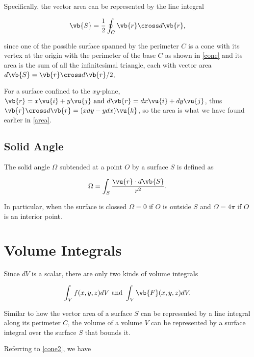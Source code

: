 \documentclass[english,a4paper,12pt]{report}
\begin{document}
Specifically, the vector area can be represented by the line integral 

\begin{equation}
	\vb{S} = \frac{1}{2} \oint_{C} \vb{r} \cross d\vb{r}, 
\end{equation}

since one of the possible surface spanned by the perimeter \(C\) is a cone with its vertex at the origin with the perimeter of the base \(C\) as shown in \cref{cone} and its area is the sum of all the infinitesimal triangle, each with vector area \( d\vb{S} =  \vb{r} \cross d\vb{r} /2  \).  


For a surface confined to the \(xy\)-plane, \(\vb{r} = x \vu{i} + y \vu{j} \text { and } d\vb{r} = dx \vu{i} + dy \vu{j}\), thus \(\vb{r} \cross d\vb{r} = (xdy-ydx)\vu{k}\), so the area is what we have found earlier in \cref{area}.   


\subsection{Solid Angle}

The solid angle \(\Omega \) subtended at a point \(O\) by a surface \(S\) is defined as 

\begin{equation}
	\Omega = \int_{S}^{} \frac{\vu{r} \cdot d\vb{S} }{r^2} . 
\end{equation}

In particular, when the surface is clossed \(\Omega = 0\) if \(O\) is outside \(S\) and \(\Omega = 4\pi \) if \(O\) is an interior point.  

\section{Volume Integrals}

Since \(dV\) is a scalar, there are only two kinds of volume integrals

\begin{equation}
	\int_{V}^{} f(x,y,z)dV \text { and } \int_{V}^{} \vb{F} (x,y,z) dV.    
\end{equation}


Similar to how the vector area of a surface \(S\) can be represented by a line integral along its perimeter \(C\), the volume of a volume \(V\)  can be represented by a surface integral over the surface \(S\) that bounds it.

Referring to \cref{cone2}, we have
\end{document}
